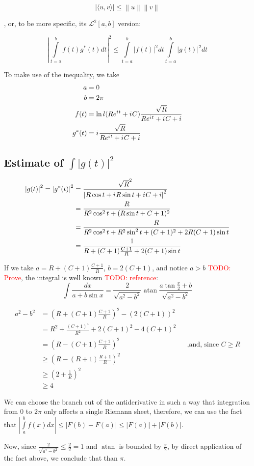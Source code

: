 \documentclass[12pt, a4paper]{article}
\newcommand{\abs}[1]{\left| #1 \right|}
\newcommand{\mcL}{\mathcal{L}}
\newcommand{\eexp}[1]{e^{#1}}
\newcommand{\iu}{{i\mkern1mu}}
\newcommand{\todo}[1]{{\large \textcolor{red}{TODO: #1}}}
\DeclareMathOperator\atan{atan}
\begin{document}
\[
\big| \langle u,v \rangle \big| \leq \left\|u\right\| \left\|v\right\|
\]

, or, to be more specific, its $\mcL^2[a, b]$ version:

\[
\abs{
\int\limits_{t=a}^{b} f(t) g^*(t) dt
}^2
\le
\int\limits_{t=a}^b \abs{f(t)}^2 dt 
\int\limits_{t=a}^b \abs{g(t)}^2 dt 
\]

To make use of the inequality, we take
\begin{align*}
a      &= 0 \\
b      &= 2 \pi \\
f(t)   &= \ln l(R \eexp{\iu t} + \iu C) \frac{\sqrt{R}}{R \eexp{\iu t} + \iu C + i} \\
g^*(t) &= \iu \frac{\sqrt{R}}{R \eexp{\iu t} + \iu C + i}
\end{align*}

\subsection*{Estimate of $\int \abs{g(t)}^2$}

\begin{align*}
\abs{g(t)}^2 = \abs{g^*(t)}^2
&=   \frac{\sqrt{R}^2}{\abs{R \cos t + \iu R \sin t + \iu C + i}^2} \\
&=   \frac{R}{R^2 \cos^2 t + (R \sin t + C + 1)^2} \\
&= \frac{R}{R^2 \cos^2 t + R^2 \sin^2 t + (C + 1)^2  + 2 R (C + 1) \sin t} \\
&=   \frac{1}{R + (C + 1) \frac{C + 1}{R} + 2 (C + 1) \sin t} \\ 
\end{align*}

If we take $a = R + (C + 1) \frac{C + 1}{R}$, $b = 2 (C + 1)$, and notice $a > b$ \todo{Prove}, the integral is well known \todo{reference}:
\[
\int \frac{dx}{a + b \sin x} = \frac{2}{\sqrt{a^2 - b^2}} \atan \frac{a \tan \frac{x}{2} + b}{\sqrt{a^2 - b^2}}
\]


\begin{align*}
a^2 - b^2
& =  (R + (C + 1) \frac{C + 1}{R})^2 - (2 (C + 1))^2\\
& =  R^2 + \frac{(C+1)^4}{R^2} + 2 (C+1)^2 - 4 (C + 1)^2 \\
& =  (R - (C + 1) \frac{C + 1}{R})^2 && \text{,and, since $C \ge R$} \\
&\ge (R - (R + 1) \frac{R + 1}{R})^2 \\
&\ge (2 + \frac{1}{R})^2 \\
&\ge 4
\end{align*}

We can choose the branch cut of the antiderivative in such a way that integration from $0$ to $2 \pi$ only affects a single Riemann sheet, therefore, we can use the fact that $\abs{\int\limits_a^b f(x) dx} \le \abs{F(b) - F(a)} \le \abs{F(a)} + \abs{F(b)}$.

Now, since $\frac{2}{\sqrt{a^2 - b^2}} \le \frac{2}{2} = 1$ and $\atan$ is bounded by $\frac{\pi}{2}$, by direct application of the fact above, we conclude that than $\pi$.
\end{document}
